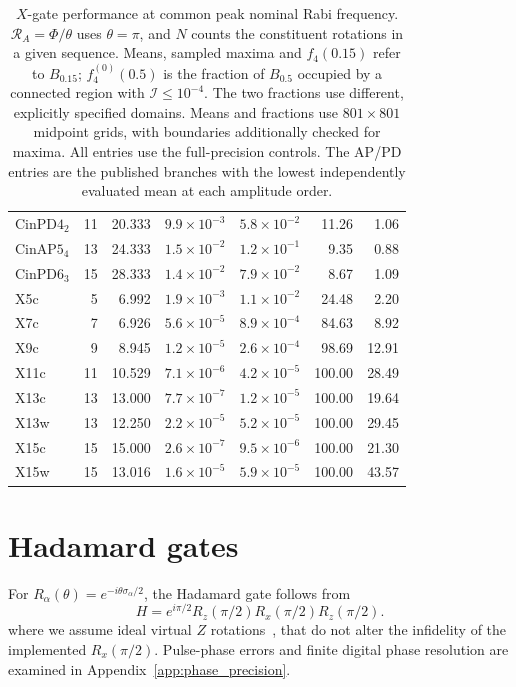 \documentclass[10pt,aps,twocolumn,pra,floatfix,superscriptaddress]{revtex4-2}
\begin{document}
\begin{table}[tp]
\begin{ruledtabular}
\begin{tabular}{lrrrrrr}
$\mathrm{CinPD4}_{2}$ & 11 & 20.333 & $9.9\times10^{-3}$ & $5.8\times10^{-2}$ & 11.26 & 1.06 \\
$\mathrm{CinAP5}_{4}$ & 13 & 24.333 & $1.5\times10^{-2}$ & $1.2\times10^{-1}$ & 9.35 & 0.88 \\
$\mathrm{CinPD6}_{3}$ & 15 & 28.333 & $1.4\times10^{-2}$ & $7.9\times10^{-2}$ & 8.67 & 1.09 \\
X5c & 5 & 6.992 & $1.9\times10^{-3}$ & $1.1\times10^{-2}$ & 24.48 & 2.20 \\
X7c & 7 & 6.926 & $5.6\times10^{-5}$ & $8.9\times10^{-4}$ & 84.63 & 8.92 \\
X9c & 9 & 8.945 & $1.2\times10^{-5}$ & $2.6\times10^{-4}$ & 98.69 & 12.91 \\
X11c & 11 & 10.529 & $7.1\times10^{-6}$ & $4.2\times10^{-5}$ & 100.00 & 28.49 \\
X13c & 13 & 13.000 & $7.7\times10^{-7}$ & $1.2\times10^{-5}$ & 100.00 & 19.64 \\
X13w & 13 & 12.250 & $2.2\times10^{-5}$ & $5.2\times10^{-5}$ & 100.00 & 29.45 \\
X15c & 15 & 15.000 & $2.6\times10^{-7}$ & $9.5\times10^{-6}$ & 100.00 & 21.30 \\
X15w & 15 & 13.016 & $1.6\times10^{-5}$ & $5.9\times10^{-5}$ & 100.00 & 43.57 \\
\end{tabular}
\end{ruledtabular}
\caption{$X$-gate performance at common peak nominal Rabi frequency. $\mathcal R_A=\Phi/\theta$ uses $\theta=\pi$, and $N$ counts the constituent rotations in a given sequence. Means, sampled maxima and $f_4(0.15)$ refer to $B_{0.15}$; $f_4^{(0)}(0.5)$ is the fraction of $B_{0.5}$ occupied by a connected region with $\mathcal I\leq10^{-4}$. The two fractions use different, explicitly specified domains. Means and fractions use $801\times801$ midpoint grids, with boundaries additionally checked for maxima. All entries use the full-precision controls. The AP/PD entries are the published branches with the lowest independently evaluated mean at each amplitude order.}
\label{table:resource_comparison}
\end{table}


\section{Hadamard gates}
\label{Sec:Hadamard}

For $R_\alpha(\theta)=e^{-i\theta\sigma_\alpha/2}$, the Hadamard gate follows from
\begin{equation}
H=e^{i\pi/2}R_z(\pi/2)R_x(\pi/2)R_z(\pi/2).
\end{equation}
where we assume ideal virtual $Z$ rotations~\cite{McKay_2017}, that do not alter the infidelity of the implemented $R_x(\pi/2)$. Pulse-phase errors and finite digital phase resolution are examined in Appendix~\ref{app:phase_precision}.
\end{document}
